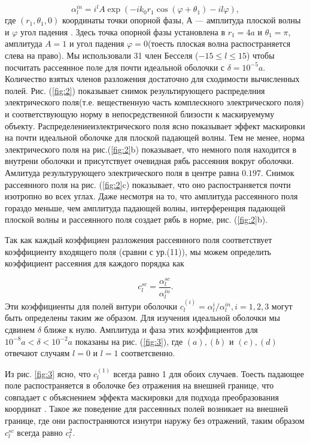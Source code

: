 \documentclass[a4paper, 12pt]{article}
\begin{document}
\begin{equation}
	\alpha_l^{in} = i^l A \exp(-ik_0r_1\cos(\varphi+\theta_1)-il\varphi),
\end{equation}
где $(r_1, \theta_1, 0)$ координаты точки опорной фазы, А --- амплитуда плоской волны и $\varphi$ угол падения \cite{13}.
Здесь точка опорной фазы установлена в $r_1=4a$ и $\theta_1=\pi$, амплитуда $A=1$ и угол падения $\varphi=0$(тоесть 
плоская волна распостраняется слева на право). Мы использовали 31 член Бесселя ($-15 \le l \le 15$) чтобы посчитать
рассеянное поле для почти идеальной оболочки с $\delta=10^{-5}a$. Количество взятых членов разложения достаточно для
сходимости вычисленных полей. Рис. (\ref{fig:2}) показывает снимок результирующего распределния электрического поля(т.е. 
вещественную часть комплескного электрического поля) и соответствующую норму в непосредственной близости к маскируемуму 
объекту. Распределениеиэлектрического поля ясно показывает эффект маскировки на почти идеальной оболочке для плоской
падающей волны. Тем не менее, норма электрического поля на рис.(\ref{fig:2}b) показывает, что немного поля находится в
внутрени оболочки и присутствует очевидная рябь рассеяния вокруг оболочки. Амлитуда результурующего электрического поля
в центре равна $0.197$. Снимок рассеянного поля на рис. (\ref{fig:2}c) показывает, что оно распостраняется почти изотропно
во всех углах. Даже несмотря на то, что амплитуда рассеянного поля гораздо меньше, чем амплитуда падающей волны, 
интерференция падающей плоской волны и рассеянного поля создает рябь в норме, рис. (\ref{fig:2}b).

Так как каждый коэффициен разложения рассеянного поля соответствует коэффициенту входящего поля (сравни с ур.(11)), мы
можем определить коэффициент рассеяния для каждого порядка как

\begin{equation}
	c_l^{sc} = \frac{\alpha_l^{sc}}{\alpha_l^{in}}.
\end{equation}
Эти коэффициенты для полей внтури оболочки $c_l^{(i)}= \alpha_l^{i}/\alpha_l^{in}, i=1,2,3$ могут быть определены таким же
образом. Для изучения идеальной оболочки мы сдвинем $\delta$ ближе к нулю. Амплитуда и фаза этих коэффициентов для
$10^{-8}a<\delta<10^{-2}a$ показаны на рис. (\ref{fig:3}), где $(a),(b)$ и $(c),(d)$ отвечают случаям $l=0$ и $l=1$
соответсвенно.

Из рис. \ref{fig:3} ясно, что $c_l^{(1)}$ всегда равно 1 для обоих случаев. Тоесть падающее поле распостраняется в 
оболочке без отражения на внешней границе, что совпадает с объяснением эффекта маскировки для подхода преобразования 
координат \cite{1}. Такое же поведение для рассеянных полей возникает на внешней границе, где они распостраняются 
изнутри наружу без отражений, таким образом $c_l^{sc}$ всегда равно $c_l^2$.
\end{document}
